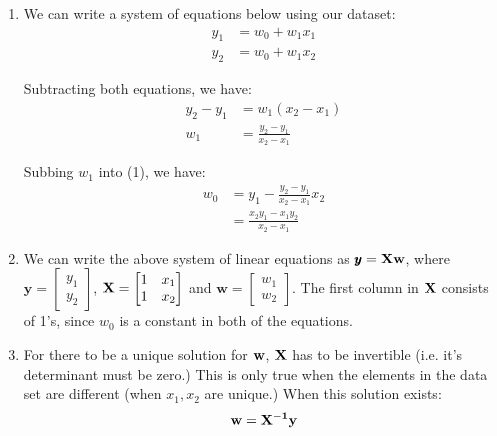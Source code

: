 \documentclass{harvardml}
\theoremstyle{definition}
\theoremstyle{plain}
\begin{document}
\begin{enumerate}
\item 
    We can write a system of equations below using our dataset:
        \begin{align}
            y_1 &= w_0 + w_1x_1\\
            y_2 &= w_0 + w_1x_2
        \end{align}
        
    Subtracting both equations, we have:
        \begin{align*}
            y_2 - y_1 &= w_1(x_2 - x_1)\\
            w_1 &= \frac{y_2 - y_1}{x_2 - x_1}
        \end{align*}
        
    Subbing $w_1$ into (1), we have:
        \begin{align*}
            w_0 &= y_1 - \frac{y_2 - y_1}{x_2 - x_1} x_2\\
            &= \frac{x_2y_1 - x_1y_2}{x_2 - x_1}
        \end{align*}

\item
    We can write the above system of linear equations as $\pmb{y} = \bf{Xw}$, where $\pmb{y} = 
    \begin{bmatrix}
        y_1\\
        y_2
    \end{bmatrix}$,
    $\bf{X} =
    \begin{bmatrix}
        1 & x_1\\
        1 & x_2
    \end{bmatrix}$
    and $\pmb{w}=
    \begin{bmatrix}
        w_1\\
        w_2
    \end{bmatrix}$.
    The first column in $\bf{X}$ consists of 1's, since $w_0$ is a constant in both of the equations.

\item
    For there to be a unique solution for $\bf{w}$, $\bf{X}$ has to be invertible (i.e. it's determinant must be zero.) This is only true when the elements in the data set are different (when $x_1, x_2$ are unique.) When this solution exists:
    \begin{equation*}
        \bf{w} = \bf{X^{-1}y}
    \end{equation*}


\end{enumerate}
\end{document}

